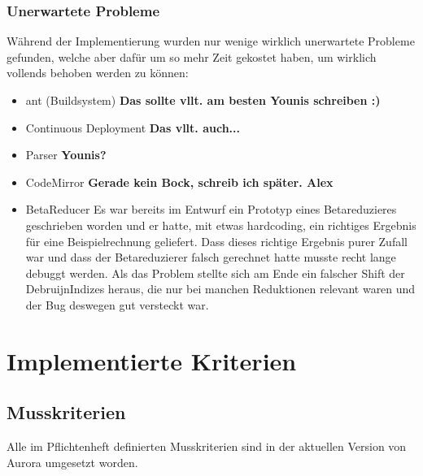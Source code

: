 \documentclass[parskip=full,11pt,twoside]{scrartcl}
\begin{document}
\subsubsection{Unerwartete Probleme}
Während der Implementierung wurden nur wenige wirklich unerwartete Probleme gefunden, welche aber dafür um so mehr Zeit gekostet haben, um wirklich vollends behoben werden zu können:
\begin{itemize}
    \item ant (Buildsystem)
        \newline
        \textbf{Das sollte vllt. am besten Younis schreiben :)}
    \item Continuous Deployment
        \newline
        \textbf{Das vllt. auch...}
    \item Parser
        \newline
        \textbf{Younis?}
    \item CodeMirror
        \newline
        \textbf{Gerade kein Bock, schreib ich später. Alex}
    \item BetaReducer
    \newline
Es war bereits im Entwurf ein Prototyp eines Betareduzieres geschrieben worden und er hatte, mit etwas hardcoding, ein richtiges Ergebnis für eine Beispielrechnung geliefert. Dass dieses richtige Ergebnis purer Zufall war und dass der Betareduzierer falsch gerechnet hatte musste recht lange debuggt werden. Als das Problem stellte sich am Ende ein falscher Shift der DebruijnIndizes heraus, die nur bei manchen Reduktionen relevant waren und der Bug deswegen gut versteckt war.

\end{itemize}

\newpage


\section{Implementierte Kriterien}

\subsection{Musskriterien}
Alle im Pflichtenheft definierten Musskriterien sind in der aktuellen Version von Aurora umgesetzt worden.
\end{document}
